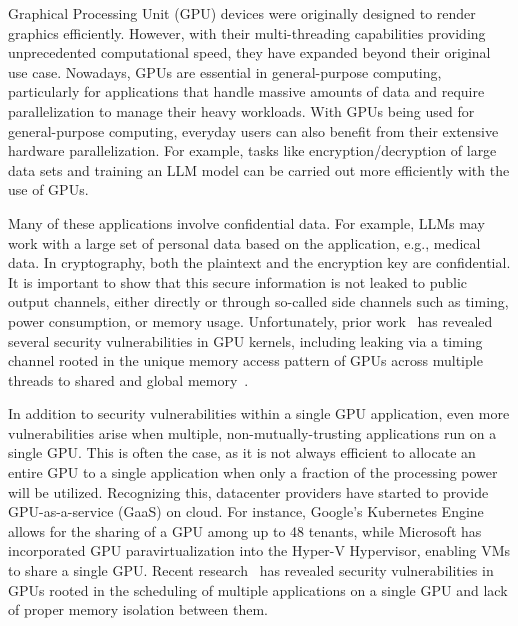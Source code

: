 Graphical Processing Unit (GPU) devices were originally designed to render graphics efficiently.
%
However, with their multi-threading capabilities providing unprecedented computational speed, they have expanded beyond their original use case.
%
Nowadays, GPUs are essential in general-purpose computing, particularly for applications that handle massive amounts of data and require parallelization to manage their heavy workloads.
%
With GPUs being used for general-purpose computing, everyday users can also benefit from their extensive hardware parallelization.
%
For example, tasks like encryption/decryption of large data sets and training an LLM model can be carried out more efficiently with the use of GPUs.

Many of these applications involve confidential data. 
%
For example, LLMs may work with a large set of personal data based on the application, e.g., medical data.
%
In cryptography, both the plaintext and the encryption key are confidential.
%
It is important to show that this secure information is not leaked to public output channels, either directly or through so-called side channels such as timing, power consumption, or memory usage.
%
Unfortunately, prior work~\cite{AESattack, jiang2019TACO, jiang2019thesis, pustelnik2024arxiv} has revealed several security vulnerabilities in GPU kernels, including leaking via a timing channel rooted in the unique memory access pattern of GPUs across multiple threads to shared and global memory~\cite{AESattack, jiang2019TACO, jiang2019thesis}.

In addition to security vulnerabilities within a single GPU application, even more vulnerabilities arise when multiple, non-mutually-trusting applications run on a single GPU.
%
This is often the case, as it is not always efficient to allocate an entire GPU to a single application when only a fraction of the processing power will be utilized.
%
Recognizing this, datacenter providers have started to provide GPU-as-a-service (GaaS) on cloud.
%
For instance, Google's Kubernetes Engine allows for the sharing of a GPU among up to 48 tenants, while Microsoft has incorporated GPU paravirtualization into the Hyper-V Hypervisor, enabling VMs to share a single GPU.
%
Recent research~\cite{pietro2016TECS,hayes2017usenix} has revealed security vulnerabilities in GPUs rooted in the scheduling of multiple applications on a single GPU and lack of proper memory isolation between them.

